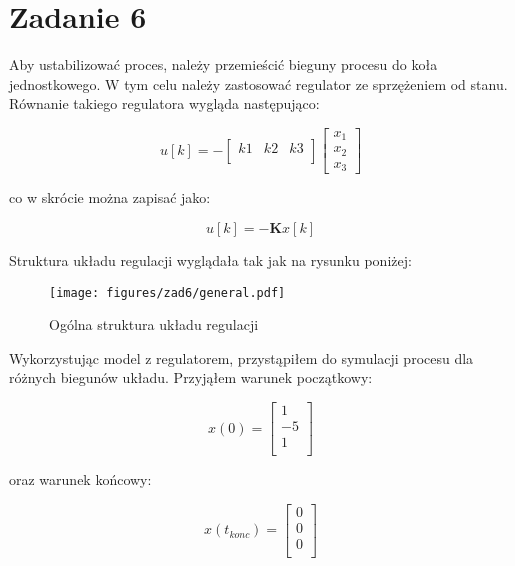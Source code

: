 \documentclass[a4paper,titlepage,11pt,floatssmall]{mwrep}
\begin{document}
\section{Zadanie 6}
\indent Aby ustabilizować proces, należy przemieścić bieguny procesu do koła jednostkowego. W tym celu należy zastosować regulator ze sprzężeniem od stanu. Równanie takiego regulatora wygląda następująco:

\[
u[k] = -
\begin{bmatrix}
    k1  &  k2  & k3    \\     
\end{bmatrix}
\begin{bmatrix}
    x_1     \\
    x_2		\\
    x_3      
\end{bmatrix} 
\]

co w skrócie można zapisać jako:

\begin{equation*}
u[k] = - \mathbf{K}x[k]
\end{equation*}

Struktura układu regulacji wyglądała tak jak na rysunku poniżej:
\begin{figure}[H]
\centering
\texttt{[image: figures/zad6/general.pdf]}
\caption{Ogólna struktura układu regulacji}
\end{figure}

\newpage

Wykorzystując model z regulatorem, przystąpiłem do symulacji procesu dla różnych biegunów układu. Przyjąłem warunek początkowy:

$$
x(0) =
\left[\begin{array}{c}
1  \\
-5 \\
1  \\
\end{array} \right]
$$

oraz warunek końcowy:

$$
x(t_{konc}) =
\left[\begin{array}{c}
0  \\
0 \\
0  \\
\end{array} \right]
$$
\end{document}
